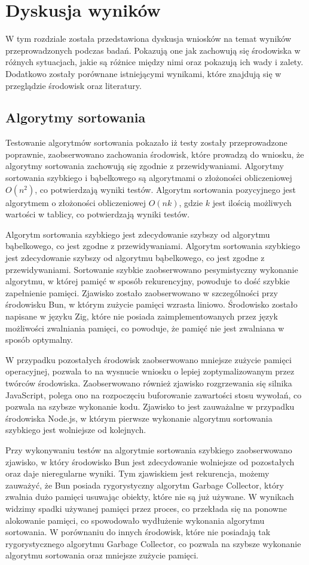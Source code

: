 \section{Dyskusja wyników}
W tym rozdziale została przedstawiona dyskusja wniosków na temat wyników przeprowadzonych podczas badań. Pokazują one jak zachowują się środowiska w różnych sytuacjach, jakie są różnice między nimi oraz pokazują ich wady i zalety. Dodatkowo zostały porównane istniejącymi wynikami, które znajdują się w przeglądzie środowisk oraz literatury.

\subsection{Algorytmy sortowania}
Testowanie algorytmów sortowania pokazało iż testy zostały przeprowadzone poprawnie, zaobserwowano zachowania środowisk, które prowadzą do wniosku, że algorytmy sortowania zachowują się zgodnie z przewidywaniami. Algorytmy sortowania szybkiego i bąbelkowego są algorytmami o złożoności obliczeniowej $O(n^2)$, co potwierdzają wyniki testów. Algorytm sortowania pozycyjnego jest algorytmem o złożoności obliczeniowej $O(nk)$, gdzie $k$ jest ilością możliwych wartości w tablicy, co potwierdzają wyniki testów.

Algorytm sortowania szybkiego jest zdecydowanie szybszy od algorytmu bąbelkowego, co jest zgodne z przewidywaniami. Algorytm sortowania szybkiego jest zdecydowanie szybszy od algorytmu bąbelkowego, co jest zgodne z przewidywaniami. Sortowanie szybkie zaobserwowano pesymistyczny wykonanie algorytmu, w której pamięć w sposób rekurencyjny, powoduje to dość szybkie zapełnienie pamięci. Zjawisko zostało zaobserwowano w szczególności przy środowisku Bun, w którym zużycie pamięci wzrasta liniowo. Środowisko zostało napisane w języku Zig, które nie posiada zaimplementowanych przez język możliwości zwalniania pamięci, co powoduje, że pamięć nie jest zwalniana w sposób optymalny. 

W przypadku pozostałych środowisk zaobserwowano mniejsze zużycie pamięci operacyjnej, pozwala to na wysnucie wniosku o lepiej zoptymalizowanym przez twórców środowiska. Zaobserwowano również zjawisko rozgrzewania się silnika JavaScript, polega ono na rozpoczęciu buforowanie zawartości stosu wywołań, co pozwala na szybsze wykonanie kodu. Zjawisko to jest zauważalne w przypadku środowiska Node.js, w którym pierwsze wykonanie algorytmu sortowania szybkiego jest wolniejsze od kolejnych.

Przy wykonywaniu testów na algorytmie sortowania szybkiego zaobserwowano zjawisko, w który środowisko Bun jest zdecydowanie wolniejsze od pozostałych oraz daje nieregularne wyniki. Tym zjawiskiem jest rekurencja, możemy zauważyć, że Bun posiada rygorystyczny algorytm Garbage Collector, który zwalnia dużo pamięci usuwając obiekty, które nie są już używane. W wynikach widzimy spadki używanej pamięci przez proces, co przekłada się na ponowne alokowanie pamięci, co spowodowało wydłużenie wykonania algorytmu sortowania. W porównaniu do innych środowisk, które nie posiadają tak rygorystycznego algorytmu Garbage Collector, co pozwala na szybsze wykonanie algorytmu sortowania oraz mniejsze zużycie pamięci. 

